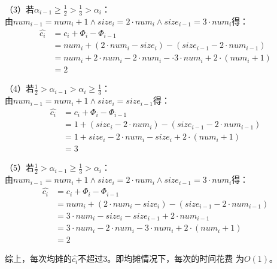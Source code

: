 \begin{solution}
    （3）若$\alpha_{i-1} \ge \frac{1}{2} > \frac{1}{3} > \alpha_i$：\\
    由$num_{i-1}=num_i+1 \wedge size_i = 2\cdot num_i \wedge size_{i-1} = 3\cdot num_i$得：
    \begin{align*}
        \hat{c_i} &= c_i + \Phi_i - \Phi_{i-1}\\
        &= num_i + (2\cdot num_{i} - size_{i}) - (size_{i-1} - 2 \cdot num_{i-1})\\
        &= num_i + 2\cdot num_i - 2\cdot num_i -  \cdot 3\cdot num_i + 2\cdot(num_i + 1)\\
        &= 2
    \end{align*}

    （4）若$\frac{1}{2} > \alpha_{i-1} > \alpha_{i} \ge \frac{1}{3}$：\\
    由$num_{i-1}=num_i+1 \wedge size_i = size_{i-1}$得：
    \begin{align*}
        \hat{c_i} &= c_i + \Phi_i - \Phi_{i-1}\\
        &= 1 + (size_{i} - 2 \cdot num_{i}) - (size_{i-1} - 2 \cdot num_{i-1})\\
        &= 1 + size_i - 2\cdot num_{i} - size_i + 2\cdot (num_i+1)\\
        &= 3
    \end{align*}

    （5）若$\frac{1}{2} > \alpha_{i-1} \ge \frac{1}{3} > \alpha_i$：\\
    由$num_{i-1}=num_i+1 \wedge size_i = 2\cdot num_i \wedge size_{i-1} = 3\cdot num_i$得：
    \begin{align*}
        \hat{c_i} &= c_i + \Phi_i - \Phi_{i-1}\\
        &= num_i + (2 \cdot num_{i} - size_{i}) - (size_{i-1} - 2 \cdot num_{i-1})\\
        &= 3\cdot num_i - size_i - size_{i-1} + 2\cdot num_{i-1}\\
        &= 3\cdot num_i - 2\cdot num_i - 3\cdot num_i + 2\cdot(num_i+1)\\
        &= 2
    \end{align*}

    综上，每次均摊的$\hat{c_i}$不超过3。即均摊情况下，每次的时间花费
    为$O(1)$。
\end{solution}